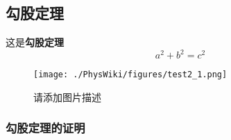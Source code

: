 
\subsection{勾股定理}
这是\textbf{勾股定理}
\begin{equation}
a^2 + b^2 = c^2
\end{equation}

\begin{figure}[ht]
\centering
\texttt{[image: ./PhysWiki/figures/test2\_1.png]}
\caption{请添加图片描述} \label{test2_1}
\end{figure}

\subsubsection{勾股定理的证明}
